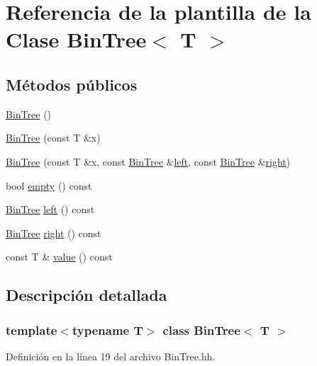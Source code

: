 \hypertarget{class_bin_tree}{}\section{Referencia de la plantilla de la Clase Bin\+Tree$<$ T $>$}
\label{class_bin_tree}
\subsection*{Métodos públicos}
\begin{DoxyCompactItemize}
\item 
\mbox{\hyperlink{class_bin_tree_a47eef22d29cd023449d97c073c08e5b6}{Bin\+Tree}} ()
\item 
\mbox{\hyperlink{class_bin_tree_a1ab686e0bcf990093ff91fe71744c1a4}{Bin\+Tree}} (const T \&x)
\item 
\mbox{\hyperlink{class_bin_tree_adb7eeff76d08130c943b36af215eb521}{Bin\+Tree}} (const T \&x, const \mbox{\hyperlink{class_bin_tree}{Bin\+Tree}} \&\mbox{\hyperlink{class_bin_tree_a82108db4c1b08d1f111027788c196d4e}{left}}, const \mbox{\hyperlink{class_bin_tree}{Bin\+Tree}} \&\mbox{\hyperlink{class_bin_tree_aff8e96651b27284c329667b5ad3e4d0b}{right}})
\item 
bool \mbox{\hyperlink{class_bin_tree_a74cda259ba5c25b8ee38ed4dc33e4fad}{empty}} () const
\item 
\mbox{\hyperlink{class_bin_tree}{Bin\+Tree}} \mbox{\hyperlink{class_bin_tree_a82108db4c1b08d1f111027788c196d4e}{left}} () const
\item 
\mbox{\hyperlink{class_bin_tree}{Bin\+Tree}} \mbox{\hyperlink{class_bin_tree_aff8e96651b27284c329667b5ad3e4d0b}{right}} () const
\item 
const T \& \mbox{\hyperlink{class_bin_tree_a734e785b089c87b49187ee7c58edf5f3}{value}} () const
\end{DoxyCompactItemize}


\subsection{Descripción detallada}
\subsubsection*{template$<$typename T$>$\newline
class Bin\+Tree$<$ T $>$}



Definición en la línea 19 del archivo Bin\+Tree.\+hh.



